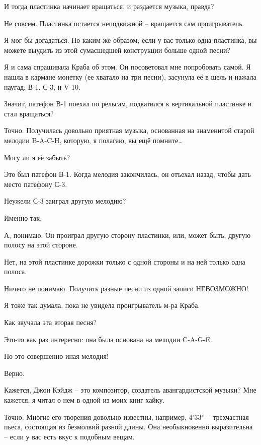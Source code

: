 \documentclass[../main.tex]{subfiles}
\begin{document}
\begin{dialogue}
 И тогда пластинка начинает вращаться, и раздается музыка, правда?

 Не совсем. Пластинка остается неподвижной \--- вращается сам проигрыватель.

 Я мог бы догадаться. Но каким же образом, если у вас только одна пластинка, вы можете выудить из этой сумасшедшей конструкции больше одной песни?

 Я и сама спрашивала Краба об этом. Он посоветовал мне попробовать самой. Я нашла в кармане монетку (ее хватало на три песни), засунула её в щель и нажала наугад: В-1, С-3, и V-10.

 Значит, патефон В-1 поехал по рельсам, подкатился к вертикальной пластинке и стал вращаться?

 Точно. Получилась довольно приятная музыка, основанная на знаменитой старой мелодии \mbox{B-A-C-H}, которую, я полагаю, вы ещё помните\ldots{}

 Могу ли я её забыть?

 Это был патефон В-1. Когда мелодия закончилась, он отъехал назад, чтобы дать место патефону С-3.

 Неужели С-3 заиграл другую мелодию?

 Именно так.

 А, понимаю. Он проиграл другую сторону пластинки, или, может быть, другую полосу на этой стороне.

 Нет, на этой пластинке дорожки только с одной стороны и на ней только одна полоса.

 Ничего не понимаю. Получить разные песни из одной записи НЕВОЗМОЖНО!

 Я тоже так думала, пока не увидела проигрыватель м-ра Краба.

 Как звучала эта вторая песня?

 Это-то как раз интересно: она была основана на мелодии \mbox{C-A-G-E}.

 Но это совершенно иная мелодия!

 Верно.

 Кажется, Джон Кэйдж \--- это композитор, создатель авангардистской музыки? Мне кажется, я читал о нем в одной из моих книг хайку.

 Точно. Многие его творения довольно известны, например, 4'33'' \--- трехчастная пьеса, состоящая из безмолвий разной длины. Она необыкновенно выразительна \--- если у вас есть вкус к подобным вещам.


\end{dialogue}
\end{document}
